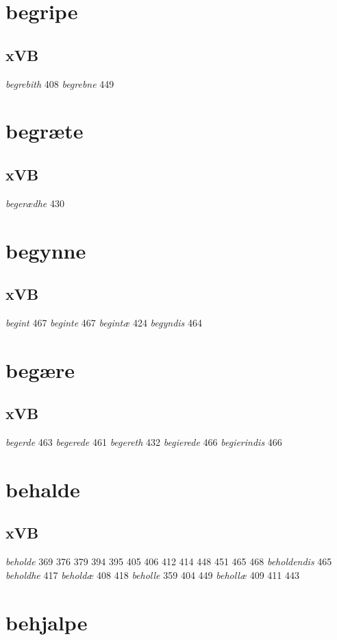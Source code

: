 \documentclass[a4paper,twocolumn]{article}
\begin{document}
\section{begripe}
\label{sec:orgbfec219}
\subsection{xVB}
\label{sec:orgda0c4f2}
\emph{begrebith} 408 \emph{begrebne} 449 
\section{begræte}
\label{sec:orgefb4464}
\subsection{xVB}
\label{sec:org650d41b}
\emph{begerædhe} 430 
\section{begynne}
\label{sec:org5838e4b}
\subsection{xVB}
\label{sec:org1e9a50b}
\emph{begint} 467 \emph{beginte} 467 \emph{begintæ} 424 \emph{begyndis} 464 
\section{begære}
\label{sec:org364ea46}
\subsection{xVB}
\label{sec:orgcef723d}
\emph{begerde} 463 \emph{begerede} 461 \emph{begereth} 432 \emph{begierede} 466 \emph{begierindis} 466 
\section{behalde}
\label{sec:org23eb743}
\subsection{xVB}
\label{sec:orga140c9a}
\emph{beholde} 369 376 379 394 395 405 406 412 414 448 451 465 468 \emph{beholdendis} 465 \emph{beholdhe} 417 \emph{beholdæ} 408 418 \emph{beholle} 359 404 449 \emph{behollæ} 409 411 443 
\section{behjalpe}
\label{sec:org0c1c1bb}
\end{document}

